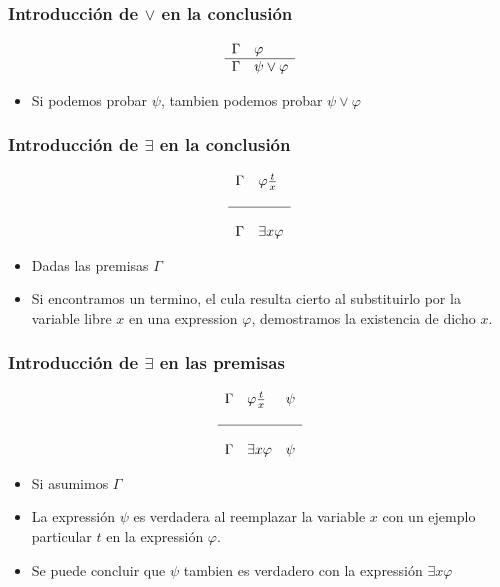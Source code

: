 \documentclass{beamer}
\begin{document}
\begin{frame}
    \frametitle{Introducci\'on de $\vee$ en la conclusi\'on}
    \[
        \begin{array}{l l}
            \Gamma & \varphi \\
            \hline
            \Gamma & \psi \vee \varphi
        \end{array}
    \]
    \begin{itemize}
        \item{Si podemos probar $\psi$, tambien podemos probar $\psi\vee\varphi$}
    \end{itemize}
\end{frame}

\begin{frame}
    \frametitle{Introducci\'on de $\exists$ en la conclusi\'on}
    \[
    \begin{array}{l l}
        \Gamma & \varphi\frac{t}{x} \\
        & \\
        \hline
        & \\
        \Gamma & \exists x\varphi
    \end{array}
    \]
    \begin{itemize}
        \item{Dadas las premisas $\Gamma$}
        \item{Si encontramos un termino, el cula resulta cierto al
            substituirlo por la variable libre $x$ en una expression $\varphi$,
            demostramos la existencia de dicho $x$.}
    \end{itemize}
\end{frame}

\begin{frame}
    \frametitle{Introducci\'on de $\exists$ en las premisas}
    \[
        \begin{array}{l l l}
            \Gamma & \varphi\frac{t}{x} & \psi \\
            & & \\
            \hline
            & & \\
            \Gamma & \exists x\varphi & \psi
        \end{array}
    \]
    \begin{itemize}
        \item{Si asumimos $\Gamma$}
        \item{La expressi\'on $\psi$ es verdadera al reemplazar la variable
        $x$ con un ejemplo particular $t$ en la expressi\'on $\varphi$.}
        \item{Se puede concluir que $\psi$ tambien es verdadero con la
        expressi\'on $\exists x\varphi$}
    \end{itemize}
\end{frame}
\end{document}
